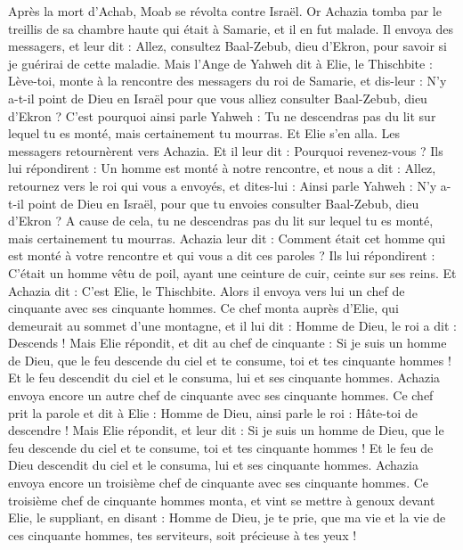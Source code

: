 \BFont
\begin{multicols}{2}
\VerseOne{}Après la mort d’Achab, Moab se révolta contre Israël.
Or Achazia tomba par le treillis de sa chambre haute qui était à Samarie, et il en fut malade. Il envoya des messagers, et leur dit : Allez, consultez Baal-Zebub, dieu d’Ekron, pour savoir si je guérirai de cette maladie.
Mais l’Ange de Yahweh dit à Elie, le Thischbite : Lève-toi, monte à la rencontre des messagers du roi de Samarie, et dis-leur : N’y a-t-il point de Dieu en Israël pour que vous alliez consulter Baal-Zebub, dieu d’Ekron ?
C’est pourquoi ainsi parle Yahweh : Tu ne descendras pas du lit sur lequel tu es monté, mais certainement tu mourras. Et Elie s’en alla.
Les messagers retournèrent vers Achazia. Et il leur dit : Pourquoi revenez-vous ?
Ils lui répondirent : Un homme est monté à notre rencontre, et nous a dit : Allez, retournez vers le roi qui vous a envoyés, et dites-lui : Ainsi parle Yahweh : N’y a-t-il point de Dieu en Israël, pour que tu envoies consulter Baal-Zebub, dieu d’Ekron ? A cause de cela, tu ne descendras pas du lit sur lequel tu es monté, mais certainement tu mourras.
Achazia leur dit : Comment était cet homme qui est monté à votre rencontre et qui vous a dit ces paroles ?
Ils lui répondirent : C’était un homme vêtu de poil, ayant une ceinture de cuir, ceinte sur ses reins. Et Achazia dit : C’est Elie, le Thischbite.
Alors il envoya vers lui un chef de cinquante avec ses cinquante hommes. Ce chef monta auprès d’Elie, qui demeurait au sommet d’une montagne, et il lui dit : Homme de Dieu, le roi a dit : Descends !
Mais Elie répondit, et dit au chef de cinquante : Si je suis un homme de Dieu, que le feu descende du ciel et te consume, toi et tes cinquante hommes ! Et le feu descendit du ciel et le consuma, lui et ses cinquante hommes.
Achazia envoya encore un autre chef de cinquante avec ses cinquante hommes. Ce chef prit la parole et dit à Elie : Homme de Dieu, ainsi parle le roi : Hâte-toi de descendre !
Mais Elie répondit, et leur dit : Si je suis un homme de Dieu, que le feu descende du ciel et te consume, toi et tes cinquante hommes ! Et le feu de Dieu descendit du ciel et le consuma, lui et ses cinquante hommes.
Achazia envoya encore un troisième chef de cinquante avec ses cinquante hommes. Ce troisième chef de cinquante hommes monta, et vint se mettre à genoux devant Elie, le suppliant, en disant : Homme de Dieu, je te prie, que ma vie et la vie de ces cinquante hommes, tes serviteurs, soit précieuse à tes yeux !

\end{multicols}
